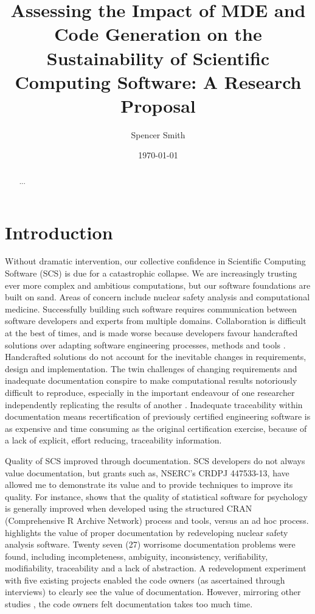 \documentclass[12pt]{article}
\begin{document}
\title{Assessing the Impact of MDE and Code Generation on the Sustainability of
  Scientific Computing Software: A Research Proposal} 
\author{Spencer Smith}
\date{\today}
	
\maketitle

\begin{abstract}
  ...
\end{abstract}

\tableofcontents

\section{Introduction}

Without dramatic intervention, our collective confidence in Scientific Computing
Software (SCS) is due for a catastrophic collapse.  We are increasingly trusting
ever more complex and ambitious computations, but our software foundations are
built on sand. Areas of concern include nuclear safety analysis and
computational medicine. Successfully building such software requires
communication between software developers and experts from multiple
domains. Collaboration is difficult at the best of times, and is made worse
because developers favour handcrafted solutions over adapting software
engineering processes, methods and tools \citep{FaulkEtAl2009}. Handcrafted
solutions do not account for the inevitable changes in requirements, design and
implementation. The twin challenges of changing requirements and inadequate
documentation conspire to make computational results notoriously difficult to
reproduce, especially in the important endeavour of one researcher independently
replicating the results of another \citep{Smith2018}.  Inadequate traceability
within documentation means re­certification of previously certified engineering
software is as expensive and time consuming as the original certification
exercise, because of a lack of explicit, effort reducing, traceability
information.

Quality of SCS improved through documentation.  SCS developers do not always
value documentation, but grants such as, NSERC's CRDPJ 447533-13, have allowed
me to demonstrate its value and to provide techniques to improve its quality.
For instance, \citet{SmithEtAl2015-SS-TR}
shows that the quality of statistical software for psychology is generally
improved when developed using the structured CRAN (Comprehensive R Archive
Network) process and tools, versus an ad hoc process.
\citet{SmithAndKoothoor2016}
highlights the value of proper documentation by redeveloping nuclear safety
analysis software.  Twenty seven (27) worrisome documentation problems were
found, including incompleteness, ambiguity, inconsistency, verifiability,
modifiability, traceability and a lack of abstraction.  A redevelopment
experiment with five existing projects \citep{SmithJegatheesanAndKelly2016}
enabled the code owners (as ascertained through interviews) to clearly see the
value of documentation.  However, mirroring other studies
\citep{CarverEtAl2007}, the code owners felt documentation takes too much time.
\end{document}
